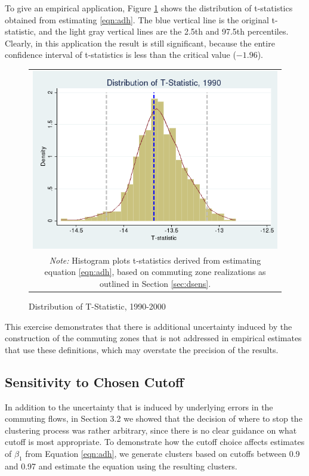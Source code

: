 To give an empirical application, Figure \ref{fig:1990_tdist} shows the distribution of t-statistics obtained from estimating \ref{eqn:adh}. The blue vertical line is the original t-statistic, and the light gray vertical lines are the 2.5th and 97.5th percentiles. Clearly, in this application the result is still significant, because the entire confidence interval of t-statistics is less than the critical value ($-1.96$).

\begin{figure}\centering
\caption{Distribution of T-Statistic, 1990-2000 \label{fig:1990_tdist}}
\begin{tabular}{c}
\includegraphics[scale=.5]{./figures/1990_tstat_distribution.png}\\
\multicolumn{1}{p{4.5in}}{\footnotesize \emph{Note:} Histogram plots t-statistics derived from estimating  equation \ref{eqn:adh}, based on commuting zone realizations as outlined in Section \ref{sec:dsens}.}
\end{tabular}
\end{figure}

This exercise demonstrates that there is additional uncertainty induced by the construction of the commuting zones that is not addressed in empirical estimates that use these definitions, which may overstate the precision of the results.

\subsection{Sensitivity to Chosen Cutoff}

In addition to the uncertainty that is induced by underlying errors in the commuting flows, in Section 3.2 we showed that the decision of where to stop the clustering process was rather arbitrary, since there is no clear guidance on what cutoff is most appropriate. To demonstrate how the cutoff choice affects estimates of $\beta_1$ from Equation \ref{eqn:adh}, we generate clusters based on cutoffs between 0.9 and 0.97 and estimate the equation using the resulting clusters.

